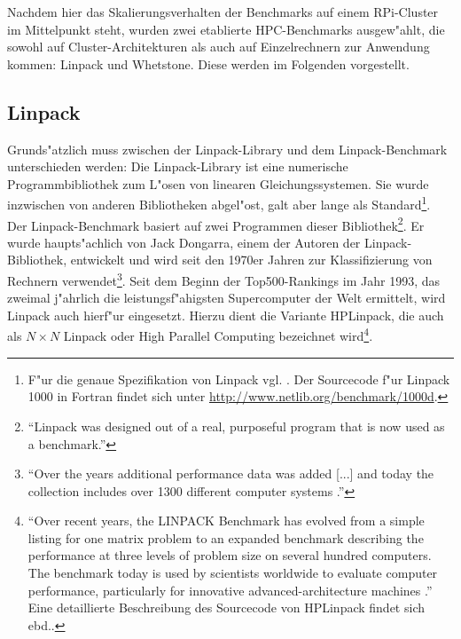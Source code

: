 Nachdem hier das Skalierungsverhalten der Benchmarks auf einem RPi-Cluster im Mittelpunkt steht, wurden zwei etablierte HPC-Benchmarks ausgew"ahlt, die sowohl auf Cluster-Architekturen als auch auf Einzelrechnern zur Anwendung kommen: Linpack und Whetstone. Diese werden im Folgenden vorgestellt. 

\subsection{Linpack}\label{Linpack}

Grunds"atzlich muss zwischen der Linpack-Library und dem Linpack-Benchmark unterschieden werden: Die Linpack-Library ist eine numerische Programmbibliothek zum L"osen von linearen Gleichungssystemen. Sie wurde inzwischen von anderen Bibliotheken abgel"ost, galt aber lange als Standard\footnote{F"ur die genaue Spezifikation von Linpack vgl. \cite{don03}. Der Sourcecode f"ur Linpack 1000 in Fortran findet sich unter \url{http://www.netlib.org/benchmark/1000d}.}. Der Linpack-Benchmark basiert auf zwei Programmen dieser Bibliothek\footnote{"`Linpack was designed out of a real, purposeful program that is now used as a benchmark\cite{wei90}."'}. Er wurde haupts"achlich von Jack Dongarra, einem der Autoren der Linpack-Bibliothek, entwickelt und wird seit den 1970er Jahren zur Klassifizierung von Rechnern verwendet\footnote{"`Over the years additional performance data was added [...] and today the collection includes over 1300 different computer systems \cite{don03}."'}. Seit dem Beginn der Top500-Rankings im Jahr 1993, das zweimal j"ahrlich die leistungsf"ahigsten Supercomputer der Welt ermittelt, wird Linpack auch hierf"ur eingesetzt. Hierzu dient die Variante HPLinpack, die auch als $N\times N$ Linpack oder High Parallel Computing bezeichnet wird\footnote{"`Over recent years, the LINPACK Benchmark has evolved from a simple listing for one matrix problem to an expanded benchmark describing the performance at three levels of problem size on several hundred computers. The benchmark today is used by scientists worldwide to evaluate computer performance, particularly for innovative advanced-architecture machines \cite{don03}."' Eine detaillierte Beschreibung des Sourcecode von HPLinpack findet sich ebd..}. 



